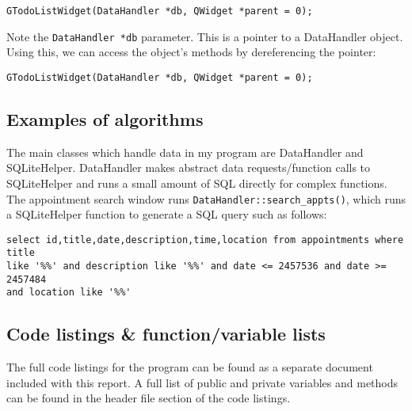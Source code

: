 \begin{verbatim}
GTodoListWidget(DataHandler *db, QWidget *parent = 0);
\end{verbatim}

Note the \texttt{DataHandler *db} parameter. This is a pointer to a DataHandler
object. Using this, we can access the object's methods by dereferencing the
pointer:

\begin{verbatim}
GTodoListWidget(DataHandler *db, QWidget *parent = 0);
\end{verbatim}


\subsection{Examples of algorithms}

The main classes which handle data in my program are DataHandler and
SQLiteHelper. DataHandler makes abstract data requests/function calls to
SQLiteHelper and runs a small amount of SQL directly for complex functions. The
appointment search window runs \verb|DataHandler::search_appts()|, which runs a
SQLiteHelper function to generate a SQL query such as follows:

\begin{verbatim}
select id,title,date,description,time,location from appointments where title
like '%%' and description like '%%' and date <= 2457536 and date >= 2457484
and location like '%%'
\end{verbatim}


\subsection{Code listings \& function/variable lists}

The full code listings for the program can be found as a separate document
included with this report. A full list of public and private variables and
methods can be found in the header file section of the code listings.
